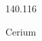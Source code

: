 \documentclass[12pt]{article}
\begin{document}
\hfill{}
\vfill
\begin{center}
  {\fontsize{50}{60}
  }

  140.116

Cerium
\end{center}
\vfill
\end{document}
